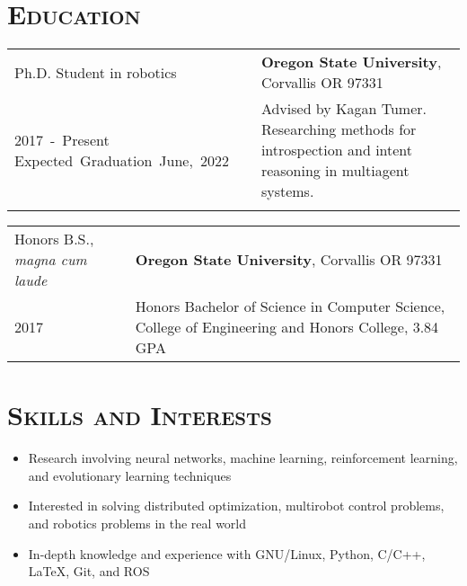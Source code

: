 \documentclass[letterpaper,10pt,titlepage]{article}
\newcommand{\leftW}{0.28\textwidth}
\begin{document}
\pagestyle{empty}%
\par{\par}

\section*{\textsc{Education}}
\begin{tabularx}{\textwidth}{p{\leftW}X}
	Ph.D. Student in robotics & \textbf{Oregon State University}, Corvallis OR 97331\\

	\mbox{2017 - Present} \mbox{Expected Graduation June, 2022}& Advised by Kagan Tumer. Researching methods for introspection and intent reasoning in multiagent systems.\\
	 &\\
\end{tabularx}
\begin{tabularx}{\textwidth}{p{\leftW}X}
	Honors B.S., \textit{magna cum laude} & \textbf{Oregon State University}, Corvallis OR 97331\\
	2017 & Honors Bachelor of Science in Computer Science, College of Engineering and Honors College, 3.84 GPA \\
\end{tabularx}

\section*{\textsc{Skills and Interests}}
\begin{itemize} \itemsep1pt \parskip0pt 
\item Research involving neural networks, machine learning, reinforcement learning, and evolutionary learning techniques
\item Interested in solving distributed optimization, multirobot control problems, and robotics problems in the real world
\item In-depth knowledge and experience with GNU/Linux, Python, C/C++, \LaTeX, Git, and ROS
\end{itemize}
\end{document}
